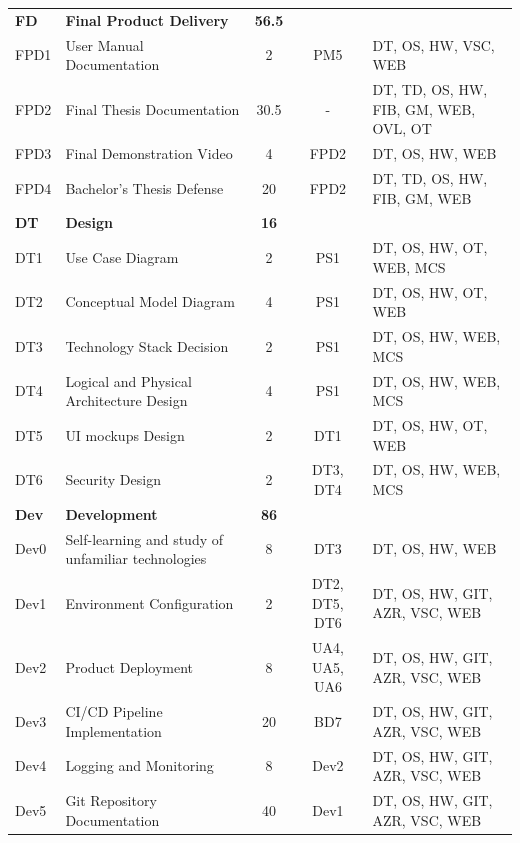\begin{longtable}{l p{6.5cm} c c p{5cm}}
    \rowcolor{gray!20}
    \textbf{FD} & \textbf{Final Product Delivery} & \textbf{56.5} & & \\ 
    \rowcolor{gray!05}
    FPD1 & User Manual Documentation & 2 & PM5 & DT, OS, HW, VSC, WEB \\ 
    \rowcolor{gray!05}
    FPD2 & Final Thesis Documentation & 30.5 & - & DT, TD, OS, HW, FIB, GM, WEB, OVL, OT \\ 
    \rowcolor{gray!05}
    FPD3 & Final Demonstration Video & 4 & FPD2 & DT, OS, HW, WEB \\ 
    \rowcolor{gray!05}
    FPD4 & Bachelor's Thesis Defense & 20 & FPD2 & DT, TD, OS, HW, FIB, GM, WEB \\ 

    \rowcolor{gray!20}
    \textbf{DT} & \textbf{Design} & \textbf{16} & & \\ 
    \rowcolor{gray!05}
    DT1 & Use Case Diagram & 2 & PS1 & DT, OS, HW, OT, WEB, MCS \\ 
    \rowcolor{gray!05}
    DT2 & Conceptual Model Diagram & 4 & PS1 & DT, OS, HW, OT, WEB \\ 
    \rowcolor{gray!05}
    DT3 & Technology Stack Decision & 2 & PS1 & DT, OS, HW, WEB, MCS \\ 
    \rowcolor{gray!05}
    DT4 & Logical and Physical Architecture Design & 4 & PS1 & DT, OS, HW, WEB, MCS \\ 
    \rowcolor{gray!05}
    DT5 & UI mockups Design & 2 & DT1 & DT, OS, HW, OT, WEB \\ 
    \rowcolor{gray!05}
    DT6 & Security Design & 2 & DT3, DT4 & DT, OS, HW, WEB, MCS \\ 

    \rowcolor{gray!20}
    \textbf{Dev} & \textbf{Development} & \textbf{86} & & \\ 
    \rowcolor{gray!05}
    Dev0 & Self-learning and study of unfamiliar technologies & 8 & DT3 & DT, OS, HW, WEB \\ 
    \rowcolor{gray!05}
    Dev1 & Environment Configuration & 2 & DT2, DT5, DT6 & DT, OS, HW, GIT, AZR, VSC, WEB \\ 
    \rowcolor{gray!05}
    Dev2 & Product Deployment & 8 & UA4, UA5, UA6 & DT, OS, HW, GIT, AZR, VSC, WEB \\ 
    \rowcolor{gray!05}
    Dev3 & CI/CD Pipeline Implementation & 20 & BD7 & DT, OS, HW, GIT, AZR, VSC, WEB \\ 
    \rowcolor{gray!05}
    Dev4 & Logging and Monitoring & 8 & Dev2 & DT, OS, HW, GIT, AZR, VSC, WEB \\ 
    \rowcolor{gray!05}
    Dev5 & Git Repository Documentation & 40 & Dev1 & DT, OS, HW, GIT, AZR, VSC, WEB \\ 


\end{longtable}
